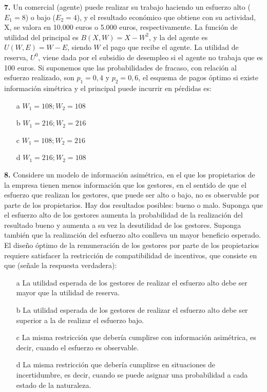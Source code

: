 \documentclass{nuevotema}
\begin{document}

\textbf{7.} Un comercial (agente) puede realizar su trabajo haciendo un esfuerzo alto ($E_1=8$) o bajo ($E_2=4$), y el resultado económico que obtiene con su actividad, X, se valora en 10.000 euros o 5.000 euros, respectivamente. La función de utilidad del principal es $B(X,W) = X-W^2$, y la del agente es $U(W,E) = W - E$, siendo $W$ el pago que recibe el agente. La utilidad de reserva, $U^0$, viene dada por el subsidio de desempleo si el agente no trabaja que es 100 euros. Si suponemos que las probabilidades de fracaso, con relación al esfuerzo realizado, son $p_1 =0,4$ y $p_2 = 0,6$, el esquema de pagos óptimo si existe información simétrica y el principal puede incurrir en pérdidas es: 

\begin{itemize}
	\item[a] $W_1 = 108; W_2=108$
	\item[b] $W_1 = 216; W_2 = 216$
	\item[c] $W_1=108; W_2 = 216$
	\item[d] $W_1=216; W_2=108$
\end{itemize}


\textbf{8.} Considere un modelo de información asimétrica, en el que los propietarios de la empresa tienen menos información que los gestores, en el sentido de que el esfuerzo que realizan los gestores, que puede ser alto o bajo, no es observable por parte de los propietarios. Hay dos resultados posibles: bueno o malo. Suponga que el esfuerzo alto de los gestores aumenta la probabilidad de la realización del resultado bueno y aumenta a su vez la desutilidad de los gestores. Suponga también que la realización del esfuerzo alto conlleva un mayor beneficio esperado. El diseño óptimo de la remuneración de los gestores por parte de los propietarios requiere satisfacer la restricción de compatibilidad de incentivos, que consiste en que (señale la respuesta verdadera):

\begin{itemize}
	\item[a] La utilidad esperada de los gestores de realizar el esfuerzo alto debe ser mayor que la utilidad de reserva.
	\item[b] La utilidad esperada de los gestores de realizar el esfuerzo alto debe ser superior a la de realizar el esfuerzo bajo.
	\item[c] La misma restricción que debería cumplirse con información asimétrica, es decir, cuando el esfuerzo es observable.
	\item[d] La misma restricción que debería cumplirse en situaciones de incertidumbre, es decir, cuando se puede asignar una probabilidad a cada estado de la naturaleza.
\end{itemize}
\end{document}
